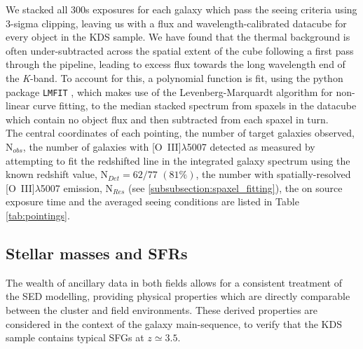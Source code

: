 \documentclass[fleqn,usenatbib]{mnras}
\begin{document}
\noindent
We stacked all 300s exposures for each galaxy which pass the seeing criteria using 3-sigma clipping, leaving us with a flux and wavelength-calibrated datacube for every object in the KDS sample.
We have found that the thermal background is often under-subtracted across the spatial extent of the cube following a first pass through the pipeline, leading to excess flux towards the long wavelength end of the {\it K}-band.
To account for this, a polynomial function is fit, using the python package {\tt LMFIT} \citep{Newville2014}, which makes use of the Levenberg-Marquardt algorithm for non-linear curve fitting, to the median stacked spectrum from spaxels in the datacube which contain no object flux and then subtracted from each spaxel in turn. \\

\noindent
The central coordinates of each pointing, the number of target galaxies observed, N$_{obs}$, the number of galaxies with [O~{\sc III}]$\lambda$5007 detected as measured by attempting to fit the redshifted line in the integrated galaxy spectrum using the known redshift value, N$_{Det} = 62/77$ $(81\%)$, the number with spatially-resolved [O~{\sc III}]$\lambda$5007 emission, N$_{Res}$ (see \cref{subsubsection:spaxel_fitting}), the on source exposure time and the averaged seeing conditions are listed in Table \ref{tab:pointings}.

\subsection{Stellar masses and SFRs}\label{subsec:stellar_masses_and_sfrs}
The wealth of ancillary data in both fields allows for a consistent treatment of the SED modelling, providing physical properties which are directly comparable between the cluster and field environments.
These derived properties are considered in the context of the galaxy main-sequence, to verify that the KDS sample contains typical SFGs at $z\simeq3.5$.   
\end{document}
